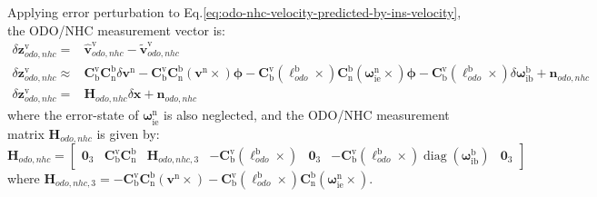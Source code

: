 \documentclass{article}
\begin{document}
Applying error perturbation to Eq.\eqref{eq:odo-nhc-velocity-predicted-by-ins-velocity}, the ODO/NHC measurement vector is:
\begin{equation}
    \begin{aligned}
    \delta \boldsymbol{z}_{odo,nhc}^{\mathrm{v}} =& \hat{\boldsymbol{v}}_{odo,nhc}^{\mathrm{v}} - \tilde{\boldsymbol{v}}_{odo,nhc}^{\mathrm{v}} \\ 
    \delta \boldsymbol{z}_{odo,nhc}^{\mathrm{v}} \approx &  \mathbf{C}_{\mathrm{b}}^{\mathrm{v}} \mathbf{C}_{\mathrm{n}}^{\mathrm{b}} \delta \boldsymbol{v}^{\mathrm{n}} - \mathbf{C}_{\mathrm{b}}^{\mathrm{v}} \mathbf{C}_{\mathrm{n}}^{\mathrm{b}} \left(\boldsymbol{v}^{\mathrm{n}} \times\right) \boldsymbol{\phi} - \mathbf{C}_{\mathrm{b}}^{\mathrm{v}} \left(\boldsymbol{\ell}_{odo}^{\mathrm{b}} \times \right) \mathbf{C}_{\mathrm{n}}^{\mathrm{b}} \left( \boldsymbol{\omega}_{\mathrm{ie}}^{\mathrm{n}} \times \right) \boldsymbol{\phi} - \mathbf{C}_{\mathrm{b}}^{\mathrm{v}} \left(\boldsymbol{\ell}_{odo}^{\mathrm{b}} \times \right) \delta \boldsymbol{\omega}_{\mathrm{ib}}^{\mathrm{b}} + \boldsymbol{n}_{odo,nhc} \\
    \delta \boldsymbol{z}_{odo,nhc}^{\mathrm{v}} =& \boldsymbol{H}_{odo,nhc} \delta \boldsymbol{x} + \boldsymbol{n}_{odo,nhc}
    \end{aligned}
\end{equation}
where the error-state of $\boldsymbol{\omega}_{\mathrm{ie}}^{\mathrm{n}}$ is also neglected, and the ODO/NHC measurement matrix $\boldsymbol{H}_{odo,nhc}$ is given by:
\begin{equation}
    \boldsymbol{H}_{odo,nhc} = \begin{bmatrix}
        \boldsymbol{0}_3 & \mathbf{C}_{\mathrm{b}}^{\mathrm{v}} \mathbf{C}_{\mathrm{n}}^{\mathrm{b}} & \boldsymbol{H}_{odo,nhc,3} & -\mathbf{C}_{\mathrm{b}}^{\mathrm{v}} \left(\boldsymbol{\ell}_{odo}^{\mathrm{b}} \times \right) & \boldsymbol{0}_3 & -\mathbf{C}_{\mathrm{b}}^{\mathrm{v}} \left(\boldsymbol{\ell}_{odo}^{\mathrm{b}} \times \right) \operatorname{diag}(\boldsymbol{\omega}_{\mathrm{ib}}^{\mathrm{b}}) & \boldsymbol{0}_3
    \end{bmatrix}
\end{equation}
where $\boldsymbol{H}_{odo,nhc,3} = - \mathbf{C}_{\mathrm{b}}^{\mathrm{v}} \mathbf{C}_{\mathrm{n}}^{\mathrm{b}} \left(\boldsymbol{v}^{\mathrm{n}} \times\right) - \mathbf{C}_{\mathrm{b}}^{\mathrm{v}} \left(\boldsymbol{\ell}_{odo}^{\mathrm{b}} \times \right) \mathbf{C}_{\mathrm{n}}^{\mathrm{b}} \left( \boldsymbol{\omega}_{\mathrm{ie}}^{\mathrm{n}} \times \right)$.
\end{document}
